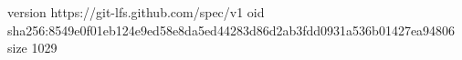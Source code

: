 version https://git-lfs.github.com/spec/v1
oid sha256:8549e0f01eb124e9ed58e8da5ed44283d86d2ab3fdd0931a536b01427ea94806
size 1029
